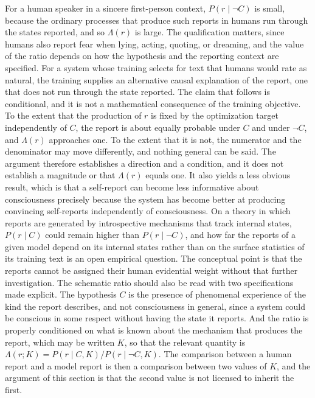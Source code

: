 \documentclass[12pt]{article}
\theoremstyle{definition}
\begin{document}
For a human speaker in a sincere first-person context, $P(r\mid\neg C)$ is small, because the ordinary processes that produce such reports in humans run through the states reported, and so $\Lambda(r)$ is large. The qualification matters, since humans also report fear when lying, acting, quoting, or dreaming, and the value of the ratio depends on how the hypothesis and the reporting context are specified. For a system whose training selects for text that humans would rate as natural, the training supplies an alternative causal explanation of the report, one that does not run through the state reported. The claim that follows is conditional, and it is not a mathematical consequence of the training objective. To the extent that the production of $r$ is fixed by the optimization target independently of $C$, the report is about equally probable under $C$ and under $\neg C$, and $\Lambda(r)$ approaches one. To the extent that it is not, the numerator and the denominator may move differently, and nothing general can be said. The argument therefore establishes a direction and a condition, and it does not establish a magnitude or that $\Lambda(r)$ equals one. It also yields a less obvious result, which is that a self-report can become less informative about consciousness precisely because the system has become better at producing convincing self-reports independently of consciousness. On a theory in which reports are generated by introspective mechanisms that track internal states, $P(r\mid C)$ could remain higher than $P(r\mid\neg C)$, and how far the reports of a given model depend on its internal states rather than on the surface statistics of its training text is an open empirical question. The conceptual point is that the reports cannot be assigned their human evidential weight without that further investigation. The schematic ratio should also be read with two specifications made explicit. The hypothesis $C$ is the presence of phenomenal experience of the kind the report describes, and not consciousness in general, since a system could be conscious in some respect without having the state it reports. And the ratio is properly conditioned on what is known about the mechanism that produces the report, which may be written $K$, so that the relevant quantity is $\Lambda(r;K)=P(r\mid C,K)/P(r\mid\neg C,K)$. The comparison between a human report and a model report is then a comparison between two values of $K$, and the argument of this section is that the second value is not licensed to inherit the first.
\end{document}
